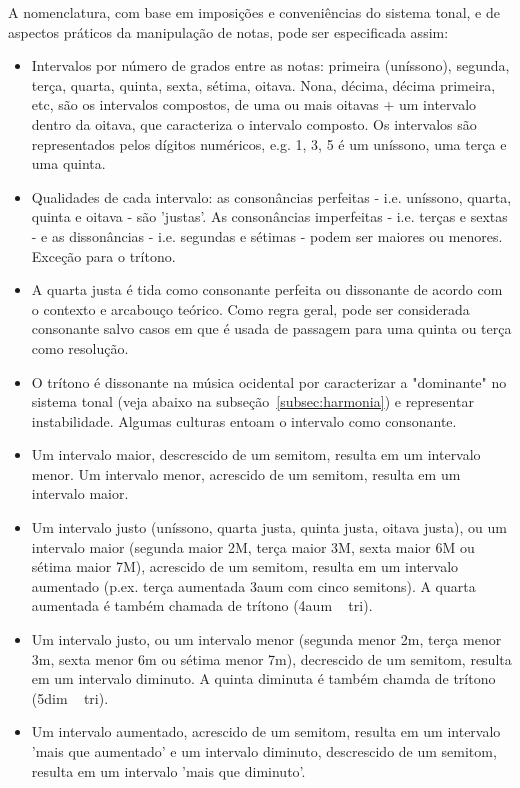 A nomenclatura, com base em imposições e conveniências do sistema tonal, e de aspectos práticos da manipulação de notas, pode ser especificada assim:\cite{Roederer,Wisnick}
\begin{itemize}
        \item Intervalos por número de grados entre as notas: primeira (uníssono), segunda, terça, quarta, quinta, sexta, sétima, oitava. Nona, décima, décima primeira, etc, são os intervalos compostos, de uma ou mais oitavas + um intervalo dentro da oitava, que caracteriza o intervalo composto. Os intervalos são representados pelos dígitos numéricos, e.g. 1, 3, 5 é um uníssono, uma terça e uma quinta.
        \item Qualidades de cada intervalo: as consonâncias perfeitas - i.e. uníssono, quarta, quinta e oitava - são 'justas'. As consonâncias imperfeitas - i.e. terças e sextas - e as dissonâncias - i.e. segundas e sétimas - podem ser maiores ou menores. Exceção para o trítono.
        \item A quarta justa é tida como consonante perfeita ou dissonante de acordo com o contexto e arcabouço teórico. Como regra geral, pode ser considerada consonante salvo casos em que é usada de passagem para uma quinta ou terça como resolução.
        \item O trítono é dissonante na música ocidental por caracterizar a "dominante" no sistema tonal (veja abaixo na subseção~\ref{subsec:harmonia}) e representar instabilidade. Algumas culturas entoam o intervalo como consonante.
        \item Um intervalo maior, descrescido de um semitom, resulta em um intervalo menor. Um intervalo menor, acrescido de um semitom, resulta em um intervalo maior.
        \item Um intervalo justo (uníssono, quarta justa, quinta justa, oitava justa), ou um intervalo maior (segunda maior 2M, terça maior 3M, sexta maior 6M ou sétima maior 7M), acrescido de um semitom, resulta em um intervalo aumentado (p.ex. terça aumentada 3aum com cinco semitons). A quarta aumentada é também chamada de trítono (4aum ~ tri).
        \item Um intervalo justo, ou um intervalo menor (segunda menor 2m, terça menor 3m, sexta menor 6m ou sétima menor 7m), decrescido de um semitom, resulta em um intervalo diminuto. A quinta diminuta é também chamda de trítono (5dim ~ tri).
        \item Um intervalo aumentado, acrescido de um semitom, resulta em um intervalo 'mais que aumentado' e um intervalo diminuto, descrescido de um semitom, resulta em um intervalo 'mais que diminuto'.

\end{itemize}
